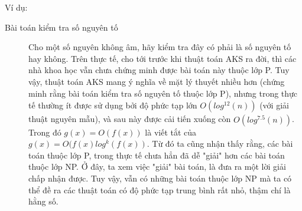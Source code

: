 \documentclass[a4paper 14pt]{extarticle}
\begin{document}
			Ví dụ:\\
			\begin{description}
				\item[Bài toán kiểm tra số nguyên tố] Cho một số nguyên không âm, hãy kiểm tra đây có phải là số nguyên tố hay không. Trên thực tế, cho tới trước khi thuật toán AKS ra đời, thì các nhà khoa học vẫn chưa chứng minh được bài toán này thuộc lớp P. Tuy vậy, thuật toán AKS mang ý nghĩa về mặt lý thuyết nhiều hơn (chứng minh rằng bài toán kiểm tra số nguyên tố thuộc lớp P), nhưng trong thực tế thường ít được sử dụng bởi độ phức tạp lớn $\overset{~}{O(log^{12}(n))}$ (với giải thuật nguyên mẫu), và sau này được cải tiến xuống còn $\overset{~}{O(log^{7.5}(n))}$. Trong đó $g(x) = \overset{~}{O(f(x))}$ là viết tắt của $g(x) = O(f(x)log^k(f(x))$. Từ đó ta cũng nhận thấy rằng, các bài toán thuộc lớp P, trong thực tế chưa hẳn đã dễ "giải" hơn các bài toán thuộc lớp NP. Ở đây, ta xem việc "giải" bài toán, là đưa ra một lời giải chấp nhận được. Tuy vậy, vẫn có những bài toán thuộc lớp NP mà ta có thể đề ra các thuật toán có độ phức tạp trung bình rất nhỏ, thậm chí là hằng số.
			\end{description}
\end{document}
